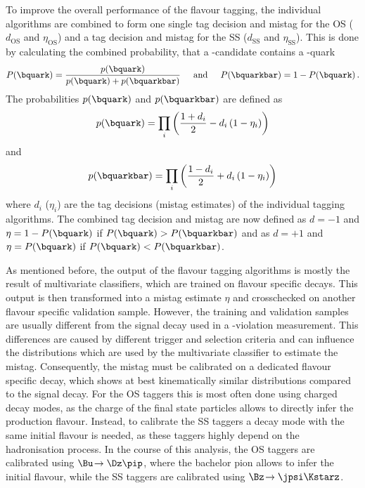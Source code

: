 To improve the overall performance of the flavour tagging, the individual algorithms are combined to form one single tag decision and mistag for the OS ($d_{\text{OS}}$ and $\eta_{\text{OS}}$) and a tag decision and mistag for the SS ($d_{\text{SS}}$ and $\eta_{\text{SS}}$).
This is done by calculating the combined probability, that a \B-candidate contains a \bquark-quark
\begin{equation}
P(\bquark)=\frac{p(\bquark)}{p(\bquark)+p(\bquarkbar)}\hspace{0.5cm}\text{and}\hspace{0.5cm}P(\bquarkbar)=1-P(\bquark)\,.
\end{equation}
The probabilities $p(\bquark)$ and $p(\bquarkbar)$ are defined as
\begin{equation}
p(\bquark)=\prod_{i}\left(\frac{1+d_i}{2}-d_i\left(1-\eta_i\right)\right)
\end{equation}
and
\begin{equation}
p(\bquarkbar)=\prod_{i}\left(\frac{1-d_i}{2}+d_i\left(1-\eta_i\right)\right)
\end{equation}
where $d_i$ ($\eta_i$) are the tag decisions (mistag estimates) of the individual tagging algorithms.
The combined tag decision and mistag are now defined as $d=-1$ and $\eta=1-P(\bquark)$ if $P(\bquark)>P(\bquarkbar)$ and as $d=+1$ and $\eta=P(\bquark)$ if $P(\bquark)<P(\bquarkbar)$.

As mentioned before, the output of the flavour tagging algorithms is mostly the result of multivariate classifiers, which are trained on flavour specific \B decays.
This output is then transformed into a mistag estimate $\eta$ and crosschecked on another flavour specific validation sample.
However, the training and validation samples are usually different from the signal decay used in a \CP-violation measurement.
This differences are caused by different trigger and selection criteria and can influence the distributions which are used by the multivariate classifier to estimate the mistag.
Consequently, the mistag must be calibrated on a dedicated flavour specific decay, which shows at best kinematically similar distributions compared to the signal decay.
For the OS taggers this is most often done using charged decay modes, as the charge of the final state particles allows to directly infer the production flavour.
Instead, to calibrate the SS taggers a decay mode with the same initial \B flavour is needed, as these taggers highly depend on the hadronisation process.
In the course of this analysis, the OS taggers are calibrated using \mbox{$\Bu\!\to\Dz\pip$}, where the bachelor pion allows to infer the initial flavour, while the SS taggers are calibrated using $\Bz\!\to\jpsi\Kstarz$.

